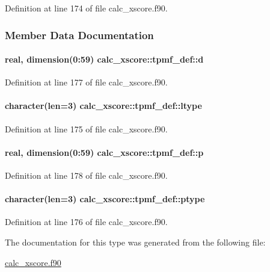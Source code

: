 Definition at line 174 of file calc\-\_\-xscore.\-f90.



\subsubsection{Member Data Documentation}
\hypertarget{structcalc__xscore_1_1tpmf__def_ad96f8e834af4cb7fdbda1731d0723a2e}{
\paragraph[{d}]{\setlength{\rightskip}{0pt plus 5cm}real, dimension(0\-:59) calc\-\_\-xscore\-::tpmf\-\_\-def\-::d}}\label{structcalc__xscore_1_1tpmf__def_ad96f8e834af4cb7fdbda1731d0723a2e}


Definition at line 177 of file calc\-\_\-xscore.\-f90.

\hypertarget{structcalc__xscore_1_1tpmf__def_ac2aedd69b07025b6d933984e96ce593c}{
\paragraph[{ltype}]{\setlength{\rightskip}{0pt plus 5cm}character(len=3) calc\-\_\-xscore\-::tpmf\-\_\-def\-::ltype}}\label{structcalc__xscore_1_1tpmf__def_ac2aedd69b07025b6d933984e96ce593c}


Definition at line 175 of file calc\-\_\-xscore.\-f90.

\hypertarget{structcalc__xscore_1_1tpmf__def_a8af3c25992eb0e49bed131e89a57beb4}{
\paragraph[{p}]{\setlength{\rightskip}{0pt plus 5cm}real, dimension(0\-:59) calc\-\_\-xscore\-::tpmf\-\_\-def\-::p}}\label{structcalc__xscore_1_1tpmf__def_a8af3c25992eb0e49bed131e89a57beb4}


Definition at line 178 of file calc\-\_\-xscore.\-f90.

\hypertarget{structcalc__xscore_1_1tpmf__def_ade3e5130d761ea8ac17b7e374264efb9}{
\paragraph[{ptype}]{\setlength{\rightskip}{0pt plus 5cm}character(len=3) calc\-\_\-xscore\-::tpmf\-\_\-def\-::ptype}}\label{structcalc__xscore_1_1tpmf__def_ade3e5130d761ea8ac17b7e374264efb9}


Definition at line 176 of file calc\-\_\-xscore.\-f90.



The documentation for this type was generated from the following file\-:\begin{DoxyCompactItemize}
\item 
\hyperlink{calc__xscore_8f90}{calc\-\_\-xscore.\-f90}\end{DoxyCompactItemize}

